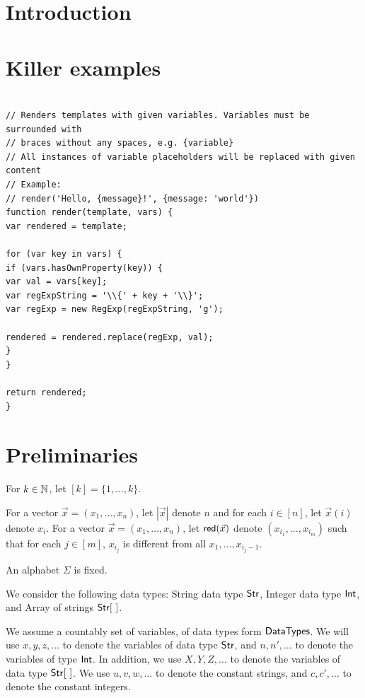 \documentclass[sigplan,10pt,review,anonymous]{acmart}\settopmatter{printfolios=true}
\newcommand{\str} {{\sf Str}}
\newcommand{\intnum} {{\sf Int}}
\newcommand{\dtypes} {{\sf DataTypes}}
\begin{document}
\section{Introduction}

\cite{LB16,TCJ16,YABI14}

\section{Killer examples}


\begin{verbatim}

// Renders templates with given variables. Variables must be surrounded with
// braces without any spaces, e.g. {variable}
// All instances of variable placeholders will be replaced with given content
// Example:
// render('Hello, {message}!', {message: 'world'})
function render(template, vars) {
var rendered = template;

for (var key in vars) {
if (vars.hasOwnProperty(key)) {
var val = vars[key];
var regExpString = '\\{' + key + '\\}';
var regExp = new RegExp(regExpString, 'g');

rendered = rendered.replace(regExp, val);
}
}

return rendered;
}
\end{verbatim}

\section{Preliminaries}

For $k \in \mathbb{N}$, let $[k] = \{1,\dots, k\}$.

For a vector $\vec{x}=(x_1,\dots, x_n)$, let $|\vec{x}|$ denote $n$ and for each $i \in [n]$, let $\vec{x}(i)$ denote $x_i$. For a vector $\vec{x} = (x_1, \dots, x_n)$, let $\mathsf{red}(\vec{x})$ denote $(x_{i_1},\dots, x_{i_m})$ such that for each $j \in [m]$, $x_{i_j}$ is different from all $x_1, \dots, x_{i_j-1}$.

An alphabet $\Sigma$ is fixed.

We consider the following data types: String data type $\str$, Integer data type $\intnum$, and Array of strings $\str [\ ]$.


We assume a countably set of variables, of data types form $\dtypes$. We will use $x, y, z, \dots$ to denote the variables of data type $\str$, and $n, n', \dots$ to denote the variables of type $\intnum$. In addition, we use $X, Y, Z, \dots$ to denote the variables of data type $\str[\ ]$.
We use $u, v, w, \dots$ to denote the constant strings, and $c, c',\dots$ to denote the constant integers.
\end{document}
